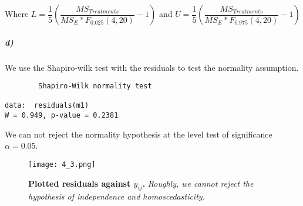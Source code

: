 \documentclass{article}
\begin{document}
\begin{center}
Where $L=\dfrac{1}{5} \left( \dfrac{MS_{Treatments}}{MS_E*F_{0.025}(4,20)} -1 \right) $ and $U=\dfrac{1}{5} \left( \dfrac{MS_{Treatments}}{MS_E*F_{0.975}(4,20)} -1 \right)$
\end{center}
\subparagraph{d)}
We use the Shapiro-wilk test with the residuals to test the normality assumption.
\begin{verbatim}
        Shapiro-Wilk normality test

data:  residuals(m1) 
W = 0.949, p-value = 0.2381  
\end{verbatim}
We can not reject the normality hypothesis at the level test of significance $\alpha=0.05$. \\
\begin{figure}[H]
	  \centering
  	\texttt{[image: 4\_3.png]}
  	\caption{\textbf{Plotted residuals against $\widehat{y}_{ij}$.} \textsl{Roughly, we cannot reject the hypothesis of independence and homoscedasticity.}
  	}
	\end{figure}
\end{document}
